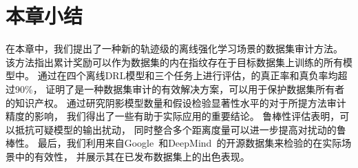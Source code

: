 \section{本章小结}
在本章中，我们提出了一种新的轨迹级的离线强化学习场景的数据集审计方法。
该方法指出累计奖励可以作为数据集的内在指纹存在于目标数据集上训练的所有模型中。
通过在四个离线DRL模型和三个任务上进行评估，\sysnameo 的真正率和真负率均超过90\%，
证明了\sysnameo 是一种数据集审计的有效解决方案，可以用于保护数据集所有者的知识产权。
通过研究阴影模型数量和假设检验显著性水平的对于所提方法审计精度的影响，
我们得出了一些有助于实际应用\sysnameo 的重要结论。
鲁棒性评估表明，\sysnameo 可以抵抗可疑模型的输出扰动，
同时整合多个距离度量可以进一步提高\sysnameo 对扰动的鲁棒性。
最后，我们利用来自Google~\cite{DBLP:conf/nips/Pomerleau88}和DeepMind~\cite{DBLP:conf/nips/Gulcehre0NPCZAM20}的开源数据集来检验\sysnameo 的在实际场景中的有效性，
并展示其在已发布数据集上的出色表现。


